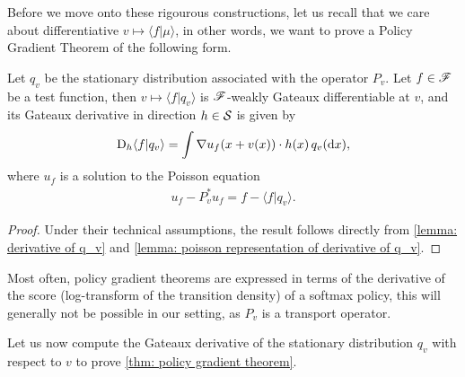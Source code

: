 \documentclass[twoside,10pt]{../jmlr}
\begin{document}
Before we move onto these rigourous constructions, let us recall that we care about differentiative $v\mapsto \langle f\vert \mu\rangle$, in other words, we want to prove a Policy Gradient Theorem of the following form.

\begin{theorem}\label{thm: policy gradient theorem}
    Let $q_v$ be the stationary distribution associated with the operator $P_v$. Let $f\in\mathscr{F}$ be a test function, then $v\mapsto \langle f\vert q_v\rangle$ is $\mathscr{F}$-weakly Gateaux differentiable at $v$, and its Gateaux derivative in direction $h\in\mathcal{S}$ is given by
    \begin{align}
        \mathrm{D}_h \langle f\vert q_v\rangle=\int \nabla u_f(x+v(x))\cdot h(x)\,q_v(\mathrm{d} x),
    \end{align}
    where $u_f$ is a solution to the Poisson equation
    \begin{align}
        u_f-P_v^*u_f=f-\langle f\vert q_v\rangle.
    \end{align}
\end{theorem}

\begin{proof}
    Under their technical assumptions, the result follows directly from \cref{lemma: derivative of q_v} and \cref{lemma: poisson representation of derivative of q_v}.  
\end{proof}

\begin{remark}
    Most often, policy gradient theorems are expressed in terms of the derivative of the score (log-transform of the transition density) of a softmax policy, this will generally not be possible in our setting, as $P_v$ is a transport operator.  
\end{remark}

Let us now compute the Gateaux derivative of the stationary distribution $q_v$ with respect to $v$ to prove \cref{thm: policy gradient theorem}. 
\end{document}
